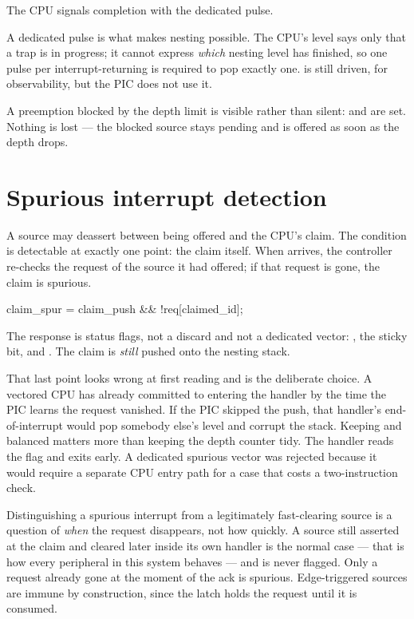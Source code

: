 The CPU signals completion with the dedicated  pulse.

A dedicated pulse is what makes nesting possible. The CPU's 
level says only that a trap is in progress; it cannot express \emph{which}
nesting level has finished, so one pulse per interrupt-returning  is
required to pop exactly one.  is still driven, for
observability, but the PIC does not use it.

A preemption blocked by the depth limit is visible rather than silent:
 and  are set. Nothing is lost --- the
blocked source stays pending and is offered as soon as the depth drops.

\section{Spurious interrupt detection}

A source may deassert between being offered and the CPU's claim. The condition is
detectable at exactly one point: the claim itself. When 
arrives, the controller re-checks the request of the source it had offered; if
that request is gone, the claim is spurious.

\begin{center}
\ttfamily\small
claim\_spur = claim\_push \&\& !req[claimed\_id];
\end{center}

The response is status flags, not a discard and not a dedicated vector:
, the sticky  bit, and
. The claim is \emph{still} pushed onto the nesting stack.

That last point looks wrong at first reading and is the deliberate choice. A
vectored CPU has already committed to entering the handler by the time the PIC
learns the request vanished. If the PIC skipped the push, that handler's
end-of-interrupt would pop somebody else's level and corrupt the stack. Keeping
 and  balanced matters more than keeping the depth counter
tidy. The handler reads the flag and exits early. A dedicated spurious vector was
rejected because it would require a separate CPU entry path for a case that costs
a two-instruction check.

Distinguishing a spurious interrupt from a legitimately fast-clearing source is a
question of \emph{when} the request disappears, not how quickly. A source still
asserted at the claim and cleared later inside its own handler is the normal case
--- that is how every peripheral in this system behaves --- and is never flagged.
Only a request already gone at the moment of the ack is spurious. Edge-triggered
sources are immune by construction, since the latch holds the request until it is
consumed.


